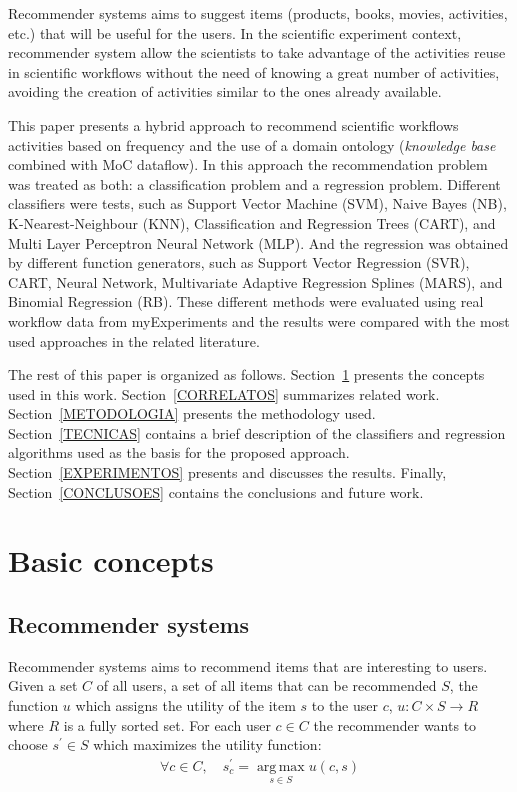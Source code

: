 \documentclass{sig-alternate-05-2015}
\begin{document}
Recommender systems aims to suggest items (products, books, movies, activities, etc.) that will be useful for the users. In the scientific experiment context, recommender system allow the scientists to take advantage of the activities reuse in scientific workflows without the need of knowing a great number of activities, avoiding the creation of activities similar to the ones already available.

This paper presents a hybrid approach to recommend scientific workflows activities based on frequency and the use of a domain ontology (\emph{knowledge base} combined with MoC dataflow).
In this approach the recommendation problem was treated as both: a classification problem and a regression problem. Different classifiers were tests, such as Support Vector Machine (SVM), Naive Bayes (NB), K-Nearest-Neighbour (KNN), Classification and Regression Trees (CART), and Multi Layer Perceptron Neural Network (MLP). And the regression was obtained by different function generators, such as Support Vector Regression (SVR), CART, Neural Network, Multivariate Adaptive Regression Splines (MARS), and Binomial Regression (RB). These different methods were evaluated using real workflow data from myExperiments and the results were compared with the most used approaches in the related literature.

The rest of this paper is organized as follows. Section~\ref{basicconcepts} presents the concepts used in this work. Section~\ref{CORRELATOS} summarizes related work. Section~\ref{METODOLOGIA} presents the methodology used. Section~\ref{TECNICAS} contains a brief description of the classifiers and regression algorithms used as the basis for the proposed approach. Section~\ref{EXPERIMENTOS} presents and discusses the results. Finally, Section~\ref{CONCLUSOES} contains the conclusions and future work.


\section{Basic concepts}\label{basicconcepts}

\subsection{Recommender systems}\label{SISTEMASRECOMENDACAO}
Recommender systems aims to recommend items that are interesting to users. Given a set \(C\) of all users, a set of all items that can be recommended \(S\), the function \(u\) which assigns the utility of the item \(s\) to the user \(c\), \(u:C \times S\rightarrow R\) where \(R\) is a fully sorted set. For each user \(c \in C \) the recommender wants to choose \(s^{'} \in S \) which maximizes the utility function:
\begin{align}
\forall c \in C,  \quad s_{c}^{'} =  \operatorname*{arg\,max}_{s \in S} u(c,s) \label{formalizar_recomendacao}
\end{align}
\end{document}
